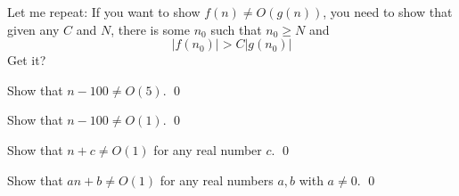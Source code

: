 Let me repeat:
If you want to show $f(n) \neq O(g(n))$, you need to show that
given any $C$ and $N$, there is some $n_0$ such that
$n_0 \geq N$ and 
\[
|f(n_0)| > C |g(n_0)|
\]
Get it?


\begin{ex}
Show that $n - 100 \neq O(5)$.
\qed
\end{ex}

\begin{ex}
Show that $n - 100 \neq O(1)$.
\qed
\end{ex}

\begin{ex}
Show that $n + c \neq O(1)$ for any real number $c$.
\qed
\end{ex}

\begin{ex}
Show that $an + b \neq O(1)$ for any real numbers $a,b$ with $a \neq 0$.
\qed
\end{ex}
